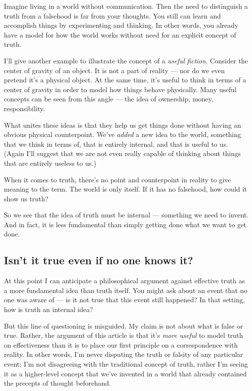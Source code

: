 \documentclass[20pt,]{extarticle}
\begin{document}
Imagine living in a world without communication. Then the need to
distinguish a truth from a falsehood is far from your thoughts. You
still can learn and accomplish things by experimenting and thinking. In
other words, you already have a model for how the world works without
need for an explicit concept of truth.

I'll give another example to illustrate the concept of a \emph{useful
fiction}. Consider the center of gravity of an object. It is not a part
of reality --- nor do we even pretend it's a physical object. At the
same time, it's useful to think in terms of a center of gravity in order
to model how things behave physically. Many useful concepts can be seen
from this angle --- the idea of ownership, money, responsibility.

What unites these ideas is that they help us get things done without
having an obvious physical counterpoint. We've \emph{added} a new idea
to the world, something that we think in terms of, that is entirely
internal, and that is useful to us. (Again I'll suggest that we are not
even really capable of thinking about things that are entirely useless
to us.)

When it comes to truth, there's no point and counterpoint in reality to
give meaning to the term. The world is only itself. If it has no
falsehood, how could it show us truth?

So we see that the idea of truth must be internal --- something we need
to invent. And in fact, it is less fundamental than simply getting done
what we want to get done.

\subsection{Isn't it true even if no one knows
it?}\label{isnt-it-true-even-if-no-one-knows-it}

At this point I can anticipate a philosophical argument against
effective truth as a more fundamental idea than truth itself. You might
ask about an event that no one was aware of --- is it not true that this
event still happened? In that setting, how is truth an internal idea?

But this line of questioning is misguided. My claim is not about what is
false or true. Rather, the argument of this article is that it's
\emph{more useful} to model truth on effectiveness than it is to place
our first principle on a correspondence with reality. In other words,
I'm never disputing the truth or falsity of any particular event; I'm
not disagreeing with the traditional concept of truth, rather I'm seeing
it as a higher-level concept that we've invented in a world that already
contained the precepts of thought beforehand.
\end{document}
